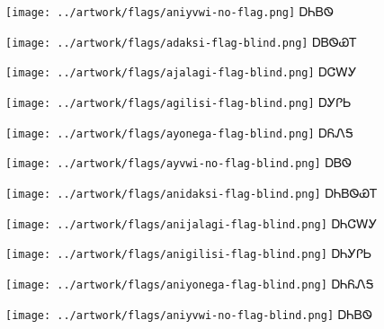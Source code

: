 \documentclass[avery5371,frame]{flashcards}%
\begin{document}
\begin{flashcard}{
\texttt{[image: ../artwork/flags/aniyvwi-no-flag.png]}
}\Huge ᎠᏂᏴᏫ
\end{flashcard}


\begin{flashcard}{
\texttt{[image: ../artwork/flags/adaksi-flag-blind.png]}
}\Huge ᎠᏴᏫᏯᎢ
\end{flashcard}

\begin{flashcard}{
\texttt{[image: ../artwork/flags/ajalagi-flag-blind.png]}
}\Huge ᎠᏣᎳᎩ
\end{flashcard}

\begin{flashcard}{
\texttt{[image: ../artwork/flags/agilisi-flag-blind.png]}
}\Huge ᎠᎩᎵᏏ
\end{flashcard}

\begin{flashcard}{
\texttt{[image: ../artwork/flags/ayonega-flag-blind.png]}
}\Huge ᎠᏲᏁᎦ
\end{flashcard}

\begin{flashcard}{
\texttt{[image: ../artwork/flags/ayvwi-no-flag-blind.png]}
}\Huge ᎠᏴᏫ
\end{flashcard}


\begin{flashcard}{
\texttt{[image: ../artwork/flags/anidaksi-flag-blind.png]}
}\Huge ᎠᏂᏴᏫᏯᎢ
\end{flashcard}

\begin{flashcard}{
\texttt{[image: ../artwork/flags/anijalagi-flag-blind.png]}
}\Huge ᎠᏂᏣᎳᎩ
\end{flashcard}

\begin{flashcard}{
\texttt{[image: ../artwork/flags/anigilisi-flag-blind.png]}
}\Huge ᎠᏂᎩᎵᏏ
\end{flashcard}

\begin{flashcard}{
\texttt{[image: ../artwork/flags/aniyonega-flag-blind.png]}
}\Huge ᎠᏂᏲᏁᎦ
\end{flashcard}

\begin{flashcard}{
\texttt{[image: ../artwork/flags/aniyvwi-no-flag-blind.png]}
}\Huge ᎠᏂᏴᏫ
\end{flashcard}
\end{document}
